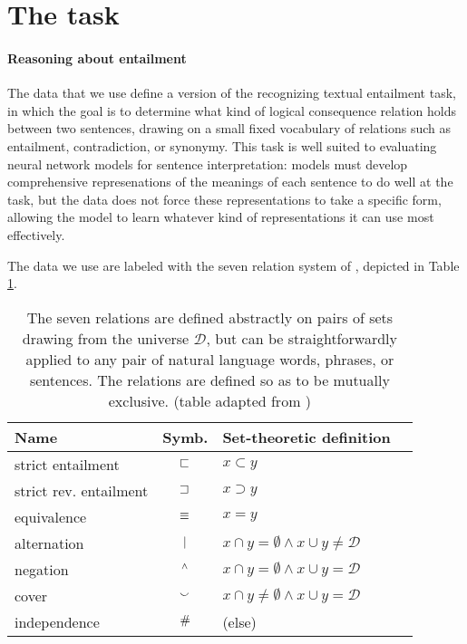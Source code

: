 \section{The task}\label{sec:recursion}
\paragraph{Reasoning about entailment} 
The data that we use define a version of the recognizing textual entailment task, in which the goal is to determine what kind of logical consequence relation holds between two sentences, drawing on a small fixed vocabulary of relations such as entailment, contradiction, or synonymy. This task is well suited to evaluating neural network models for sentence interpretation: models must develop comprehensive represenations of the meanings of each sentence to do well at the task, but the data does not force these representations to take a specific form, allowing the model to learn whatever kind of representations it can use most effectively.

The data we use are labeled with the seven relation system of , depicted in Table \ref{b-table}.

\begin{table}[tp]
  \centering\small
  \renewcommand{\arraystretch}{1}
  \begin{tabular}{l c l l} 
    \toprule
    Name & Symb. & Set-theoretic definition \\ 
    \midrule
strict entailment         & $\sqsubset$   & $x \subset y$  \\ 
    strict rev. entailment & $\sqsupset$   & $x \supset y$  \\ 
    equivalence        & $\equiv$    & $x = y$   \\ 
    alternation        & $\mathbin{|}$   & $x \cap y = \emptyset \wedge x \cup y \neq \mathcal{D}$ \\ 
    negation           & $\mathbin{^{\wedge}}$   & $x \cap y = \emptyset \wedge x \cup y = \mathcal{D}$   \\
    cover              & $\mathbin{\smallsmile}$   & $x \cap y \neq \emptyset \wedge x \cup y = \mathcal{D}$ \\ 
    independence       & $\mathbin{\#}$   & (else)\\
    \bottomrule
  \end{tabular}
  \caption{\label{b-table}The seven relations are defined abstractly on pairs of sets drawing from the universe $\mathcal{D}$, but can be straightforwardly applied to any pair of natural language words, phrases, or sentences. The relations are defined so as to be mutually exclusive. (table adapted from \protect\citealt{Bowman:Potts:Manning:2014})} %
\end{table}


